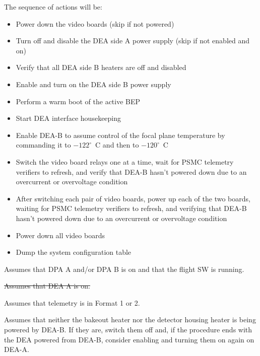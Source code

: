 \documentclass[11pt]{article}
\begin{document}
\noindent The sequence of actions will be:
{\color{red}
\begin{itemize}
\item Power down the video boards (skip if not powered)

\item Turn off and disable the DEA side A power supply (skip if not enabled and on)

\item Verify that all DEA side B heaters are off and disabled

\item Enable and turn on the DEA side B power supply

\item Perform a warm boot of the active BEP

\item Start DEA interface housekeeping

\item Enable DEA-B to assume control of the focal plane temperature
by commanding it to $-122^\circ$~C and then to $-120^\circ$~C

\item Switch the video board relays one at a time,
wait for PSMC telemetry verifiers to refresh,
and verify that DEA-B hasn't powered down due to an overcurrent
or overvoltage condition

\item After switching each pair of video boards,
power up each of the two boards, waiting for PSMC telemetry verifiers to refresh,
and verifying that DEA-B hasn't powered down due to an overcurrent
or overvoltage condition

\item Power down all video boards

\item Dump the system configuration table
\end{itemize}
}

\vspace{0.15in}

\bi
\item Assumes that DPA A and/or DPA B is on and that the flight SW is running.
\item \sout{Assumes that DEA A is on.}
\ei

\vspace{0.15in}

{\color{red}
\bi
\item Assumes that telemetry is in Format 1 or 2.
\item Assumes that neither the bakeout heater nor the detector housing heater is
being powered by DEA-B. If they are, switch them off and, if the procedure ends
with the DEA powered from DEA-B, consider enabling and turning them on again
on DEA-A.
\ei}
\end{document}
